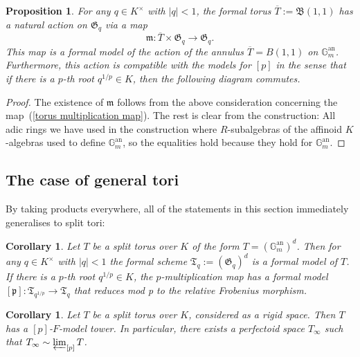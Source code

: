 \documentclass[11pt,oneside]{amsart}
\newtheorem{proposition}[theorem]{Proposition}
\newtheorem{corollary}[theorem]{Corollary}
\theoremstyle{definition}
\theoremstyle{remark}
\begin{document}
	\begin{proposition}\label{action on formal model of torus}
		For any $q\in K^\times$ with $|q|<1$, the formal torus $\overline{T}:=\mathfrak B(1,1)$ has a natural action on $\mathfrak G_q$ via a map
		\[\mathfrak m:\overline{T}\times \mathfrak G_q\rightarrow \mathfrak G_q.\]
		This map is a formal model of the action of the annulus $\overline{T}=B(1,1)$ on $\mathbb G_m^{\operatorname{an}}$. Furthermore, this action is compatible with the models for $[p]$ in the sense that if there is a $p$-th root $q^{1/p}\in K$, then the following diagram commutes.
		\begin{center}
		\end{center}
	\end{proposition} 
	\begin{proof}
		The existence of $\mathfrak m$ follows from the above consideration concerning the map~(\ref{torus multiplication map}). The rest is clear from the construction: All adic rings we have used in the construction where $R$-subalgebras of the affinoid $K$-algebras used to define $\mathbb G_m^{\operatorname{an}}$, so the equalities hold because they hold for $\mathbb G_m^{\operatorname{an}}$.
	\end{proof}
	
	\subsection{The case of general tori}
	By taking products everywhere, all of the statements in this section immediately generalises to split tori:
	\begin{corollary}\label{torus has formal models}
		Let $T$ be a split torus over $K$ of the form $T=(\mathbb G_m^{\operatorname{an}})^d$. Then for any $q\in K^\times$ with $|q|<1$ the formal scheme $\mathfrak T_q := (\mathfrak G_q)^d$ is a formal model of $T$. If there is a $p$-th root $q^{1/p}\in K$, the $p$-multiplication map has a formal model $[\mathfrak p]:\mathfrak T_{q^{1/p}}\rightarrow \mathfrak T_{q}$ that reduces mod p to the relative Frobenius morphism.
	\end{corollary}
	\begin{corollary}\label{torus has p-F-model tower and has perfectoid tilde-limit}
		Let $T$ be a split torus over $K$, considered as a rigid space. Then $T$ has a $[p]$-$F$-model tower. In particular, there exists a perfectoid space $T_\infty$ such that $T_\infty \sim \varprojlim_{[p]} T$. 
	\end{corollary}
	
\end{document}
